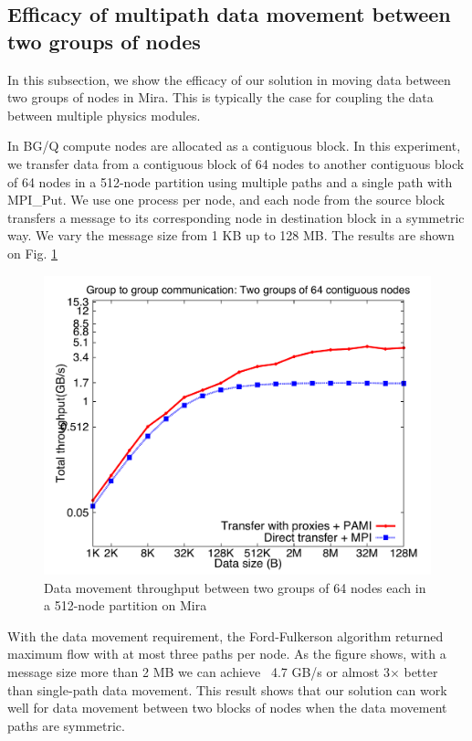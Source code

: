 \documentclass[final,5p,times]{elsarticle}
\begin{document}
\subsection{Efficacy of multipath data movement between two groups of nodes}
In this subsection, we show the efficacy of our solution in moving data between two groups of nodes in Mira. This is typically the case for coupling the data between multiple physics modules.

In BG/Q compute nodes are allocated as a contiguous block. In this experiment, we transfer data from a contiguous block of 64 nodes to another contiguous block of 64 nodes in a 512-node partition using multiple paths and a single path with MPI\_Put. We use one process per node, and each node from the source block transfers a message to its corresponding node in destination block in a symmetric way. We vary the message size from 1 KB up to 128 MB. The results are shown on Fig. \ref{fig:mncoupling_mira}

\begin{figure}[!htb]
\centering
\includegraphics[scale=0.3]{mncoupling_mira.pdf}
\caption{Data movement throughput between two groups of 64 nodes each in a 512-node partition on Mira}
\label{fig:mncoupling_mira}
\end{figure}

With the data movement requirement, the Ford-Fulkerson algorithm returned maximum flow with at most three paths per node. As the figure shows, with a message size more than 2 MB we can achieve ~4.7 GB/s or almost 3$\times$ better than single-path data movement. This result shows that our solution can work well for data movement between two blocks of nodes when the data movement paths are symmetric.
\end{document}
